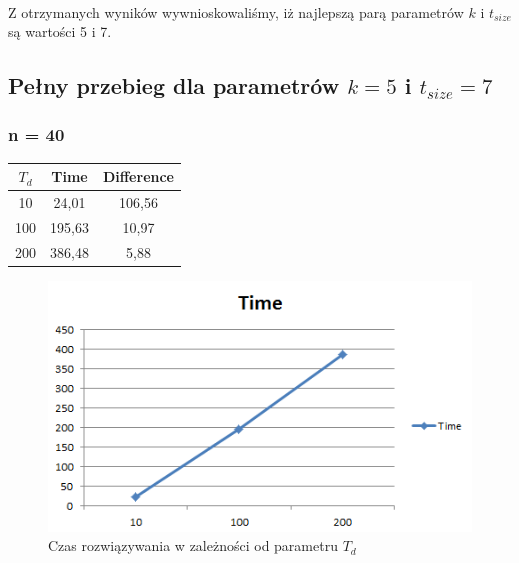 \documentclass[wide,a4paper,titlepage,12pt] {article}
\begin{document}
\paragraph{}
Z otrzymanych wyników wywnioskowaliśmy, iż najlepszą parą parametrów $k$ i $t_{size}$ są wartości 5 i 7.
\subsection{Pełny przebieg dla parametrów $k=5$ i $t_{size} = 7$}
\subsubsection{n = 40}
\begin{center}
    \begin{tabular}{|c|c|c|}
      \hline
       $T_{d}$ & Time & Difference \\ \hline
        10  &24,01&   106,56\\ \hline
        100 &195,63 & 10,97\\ \hline
        200 &386,48 & 5,88\\ \hline
    \end{tabular}
\end{center}

\begin{figure}[htbp]
  \begin{center}
         \includegraphics[scale = 0.7]{charts/time40.PNG}
         \caption{Czas rozwiązywania w zależności od parametru $T_d$}
  \end{center}
\end{figure}
\end{document}
